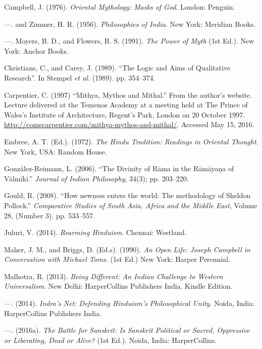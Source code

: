 \begin{thebibliography}{99}
 Campbell, J. (1976). \textit{Oriental Mythology: Masks of God}. London: Penguin.

  —. and Zimmer, H. R. (1956). \textit{Philosophies of India}. New York: Meridian Books.

  —. Moyers, B. D., and Flowers, B. S. (1991). \textit{The Power of Myth} (1st Ed.). New York: Anchor Books.

  Christians, C., and Carey, J. (1989). “The Logic and Aims of Qualitative Research”. In Stempel \textit{et al.} (1989). pp. 354--374.

  Carpentier, C. (1997) “Mithya, Mythos and Mithal.” From the author’s website. Lecture delivered at the Temenos Academy at a meeting held at The Prince of Wales's Institute of Architecture, Regent's Park, London on 20 October 1997. \url{http://comecarpentier.com/mithya-mythos-and-mithal/}. Accessed May 15, 2016.

  Embree, A. T. (Ed.). (1972). \textit{The Hindu Tradition: Readings in Oriental Thought}. New York, USA: Random House.

  González-Reimann, L. (2006). “The Divinity of Rāma in the Rāmāyaṇa of Vālmīki.” \textit{Journal of Indian Philosophy}, 34(3); pp. 203--220.

  Gould, R. (2008). “How newness enters the world: The methodology of Sheldon Pollock.” \textit{Comparative Studies of South Asia, Africa and the Middle East}, Volume 28, (Number 3). pp. 533--557.

  Juluri, V. (2014). \textit{Rearming Hinduism}. Chennai: Westland.

  Maher, J. M., and Briggs, D. (Ed.s). (1990). \textit{An Open Life: Joseph Campbell in Conversation with Michael Toms}. (1st Ed.) New York: Harper Perennial.

  Malhotra, R. (2013). \textit{Being Different: An Indian Challenge to Western Universalism}. New Delhi: HarperCollins Publishers India. Kindle Edition.

  —. (2014). \textit{Indra’s Net: Defending Hinduism’s Philosophical Unity}. Noida, India: HarperCollins Publishers India.

  —. (2016a). \textit{The Battle for Sanskrit: Is Sanskrit Political or Sacred, Oppressive or Liberating, Dead or Alive?} (1st Ed.). Noida, India: HarperCollins.


\end{thebibliography}

